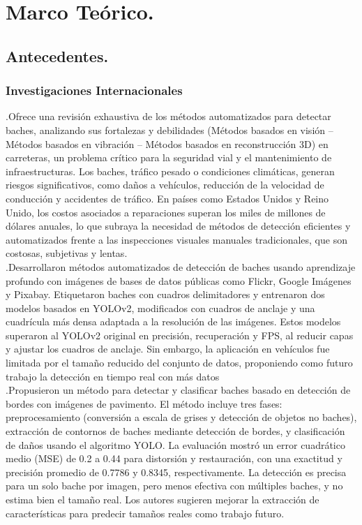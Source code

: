 
\chapter{Marco Teórico.}

\section{Antecedentes.}

\subsection{Investigaciones Internacionales}
\textcite{TC2022kim} .Ofrece una revisión exhaustiva de los métodos automatizados para detectar baches, analizando sus fortalezas y debilidades (Métodos basados en visión – Métodos basados en vibración – Métodos basados en reconstrucción 3D) en carreteras, un problema crítico para la seguridad vial y el mantenimiento de infraestructuras. Los baches, tráfico pesado o condiciones climáticas, generan riesgos significativos, como daños a vehículos, reducción de la velocidad de conducción y accidentes de tráfico. En países como Estados Unidos y Reino Unido, los costos asociados a reparaciones superan los miles de millones de dólares anuales, lo que subraya la necesidad de métodos de detección eficientes y automatizados frente a las inspecciones visuales manuales tradicionales, que son costosas, subjetivas y lentas.\\

\noindent \textcite{TC2018lim} .Desarrollaron métodos automatizados de detección de baches usando aprendizaje profundo con imágenes de bases de datos públicas como Flickr, Google Imágenes y Pixabay. Etiquetaron baches con cuadros delimitadores y entrenaron dos modelos basados en YOLOv2, modificados con cuadros de anclaje y una cuadrícula más densa adaptada a la resolución de las imágenes. Estos modelos superaron al YOLOv2 original en precisión, recuperación y FPS, al reducir capas y ajustar los cuadros de anclaje. Sin embargo, la aplicación en vehículos fue limitada por el tamaño reducido del conjunto de datos, proponiendo como futuro trabajo la detección en tiempo real con más datos\\

\noindent \textcite{TC2020baek} .Propusieron un método para detectar y clasificar baches basado en detección de bordes con imágenes de pavimento. El método incluye tres fases: preprocesamiento (conversión a escala de grises y detección de objetos no baches), extracción de contornos de baches mediante detección de bordes, y clasificación de daños usando el algoritmo YOLO. La evaluación mostró un error cuadrático medio (MSE) de 0.2 a 0.44 para distorsión y restauración, con una exactitud y precisión promedio de 0.7786 y 0.8345, respectivamente. La detección es precisa para un solo bache por imagen, pero menos efectiva con múltiples baches, y no estima bien el tamaño real. Los autores sugieren mejorar la extracción de características para predecir tamaños reales como trabajo futuro.\\

